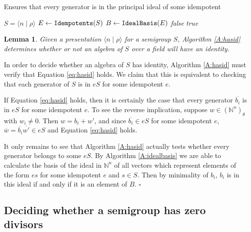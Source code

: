 \documentclass[12pt]{article}
\def\N{{\mathbb{N}}}
\newtheorem{lemma}{Lemma}
\newenvironment{proof}{{\it Proof.\/}}{$\square$\\}
\begin{document}
\begin{algorithm}
\caption{Ensures that every generator is in the principal 
ideal of some idempotent}
\label{A:hasid}
\begin{algorithmic}[1]
\REQUIRE $S = \langle n \mid \rho\rangle$ 
\STATE $E \leftarrow {\mbox{\tt Idempotents}}(S)$ \label{l:calcidemps} 
\STATE $B \leftarrow {\mbox{\tt IdealBasis}}(E)$ \label{l:unionbasis}
 \emph{false}
\ELSE
{} \emph{true}
\ENDIF
\end{algorithmic}
\end{algorithm}

\begin{lemma}\label{L:hasid}
Given a presentation $\langle n \mid \rho\rangle$ for a semigroup 
$S$, Algorithm \ref{A:hasid} determines whether or not
an algebra of $S$ over a field will have an identity.
\end{lemma}

\begin{proof}
In order to decide whether an algebra of $S$ has identity,
Algorithm \ref{A:hasid}
must verify that Equation \ref{eq:hasid} holds. 
We claim that this is equivalent to checking that 
each generator of $S$ is in $eS$ for some idempotent $e$.

If Equation \ref{eq:hasid} holds, then it is certainly the case
that every generator $\overline{b_i}$ is in $eS$ for some 
idempotent $e$. To see the
reverse implication,  suppose $w \in (\mathbb{N}^n)_\theta$ with
$w_i \neq 0$. Then $w = b_i + w'$, and since $\overline{b_i} \in eS$ for some
idempotent $e$, $\overline{w} = \overline{b_i}\overline{w'} \in eS$
and Equation  \ref{eq:hasid} holds.

It only remains to see that Algorithm \ref{A:hasid} actually tests
whether every generator belongs to some $eS$. By Algorithm \ref{A:idealbasis}
we are able to calculate the basis of the ideal in $\N^n$ of  all
vectors which represent elements of the form $es$ for some idempotent
$e$ and $s \in S$. Then by minimality of $b_i$, $b_i$ is in this ideal
if and only if it is an element of $B$.  
\end{proof}

\subsection{Deciding whether a semigroup has zero divisors}\label{s:zerodiv}
\end{document}
